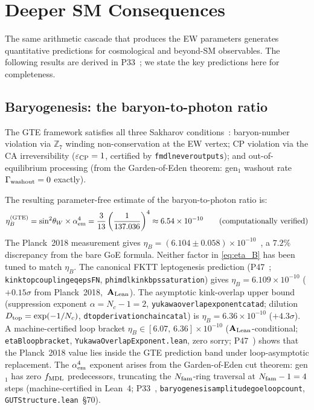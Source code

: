\documentclass[11pt]{article}
\theoremstyle{remark}
\newcommand{\GTE}{\text{GTE}}
\newcommand{\ZS}{\mathbb{Z}_7}
\newcommand{\lean}[1]{%
  \penalty-100
  \begingroup\def\_{\textunderscore\allowbreak}\texttt{#1}\endgroup}
\newcommand{\sinwsq}{\sin^2\!\theta_W}
\newcommand{\etaB}{\eta_B}
\newcommand{\CatAL}{\ensuremath{\textbf{A}_{\rm Lean}}}
\begin{document}
\section{Deeper SM Consequences}
\label{sec:deeper}

The same arithmetic cascade that produces the EW parameters generates quantitative
predictions for cosmological and beyond-SM observables. The following results are
derived in P33~\cite{SpivackDeeperConsequences}; we state the key predictions here
for completeness.

\subsection{Baryogenesis: the baryon-to-photon ratio}
\label{sec:baryogenesis}

The GTE framework satisfies all three Sakharov conditions~\cite{SpivackDeeperConsequences}:
baryon-number violation via $\ZS$ winding non-conservation at the EW vertex;
CP violation via the CA irreversibility ($\varepsilon_{\rm CP} = 1$, certified by
\lean{fmdl\_never\_outputs\_4}); and out-of-equilibrium processing (from the
Garden-of-Eden theorem: gen$_1$ washout rate $\Gamma_{\rm washout} = 0$ exactly).

The resulting parameter-free estimate of the baryon-to-photon ratio is:
\begin{equation}
  \etaB^{(\GTE)} = \sinwsq \times \alpha_{\rm em}^4
  = \frac{3}{13}\left(\frac{1}{137.036}\right)^4
  \approx 6.54 \times 10^{-10}
  \qquad (\text{computationally verified})
  \label{eq:eta_B}
\end{equation}
The Planck~2018 measurement gives
$\etaB = (6.104 \pm 0.058) \times 10^{-10}$~\cite{Planck2018Params},
a $7.2\%$ discrepancy from the bare GoE formula. Neither factor in \eqref{eq:eta_B} has been
tuned to match $\etaB$. The canonical FKTT leptogenesis prediction (P47~\cite{SpivackGTECosmology};
\lean{kink\_top\_coupling\_eq\_eps\_FN}, \lean{phi\_mdl\_kink\_bps\_saturation}) gives
$\etaB = 6.109\times10^{-10}$ ($+0.15\sigma$ from Planck~2018,~\CatAL).
The asymptotic kink-overlap upper bound (suppression exponent $\alpha = N_c - 1 = 2$,
\lean{yukawa\_overlap\_exponent\_catad}; dilution $D_{\rm top} = \exp(-1/N_c)$,
\lean{d\_top\_derivation\_chain\_catal}) is $\etaB = 6.36\times10^{-10}$ ($+4.3\sigma$).
A machine-certified loop bracket $\eta_B \in [6.07,\,6.36]\times10^{-10}$ (\CatAL-conditional;
\lean{eta\_B\_loop\_bracket}, \texttt{YukawaOverlapExponent.lean}, zero sorry;
P47~\cite{SpivackGTECosmology}) shows that the Planck~2018 value lies inside
the GTE prediction band under loop-asymptotic replacement.
The $\alpha_{\rm em}^4$ exponent arises from the Garden-of-Eden cut theorem: gen$_1$
has zero $f_{\rm MDL}$ predecessors, truncating the $N_{\rm fam}$-ring traversal at
$N_{\rm fam} - 1 = 4$ steps (machine-certified in Lean~4; P33~\cite{SpivackDeeperConsequences},
\lean{baryogenesis\_amplitude\_goe\_loop\_count}, \texttt{GUTStructure.lean}~\S70).
\end{document}
